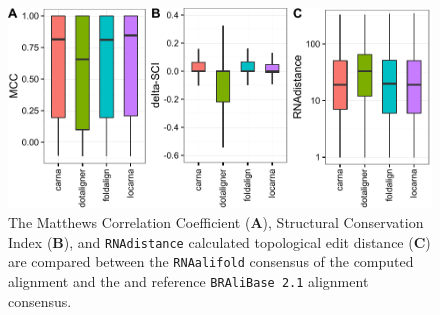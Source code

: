 \documentclass{bmcart}
\newcommand\bralibase{\texttt{BRAliBase 2.1}}
\newcommand\rnaalifold{\texttt{RNAalifold}}
\begin{document}
\begin{backmatter}
\begin{figure}[h!]
 \includegraphics[width=\textwidth]{fig2}
 \caption {  The
 Matthews Correlation Coefficient (\textbf{A}), Structural Conservation Index  
 (\textbf{B}), and \texttt{RNAdistance} calculated topological edit distance 
 (\textbf{C}) are compared between the \rnaalifold{} consensus of the computed 
 alignment and the and reference \bralibase{} alignment consensus.  }
\end{figure}



\end{backmatter}
\end{document}

